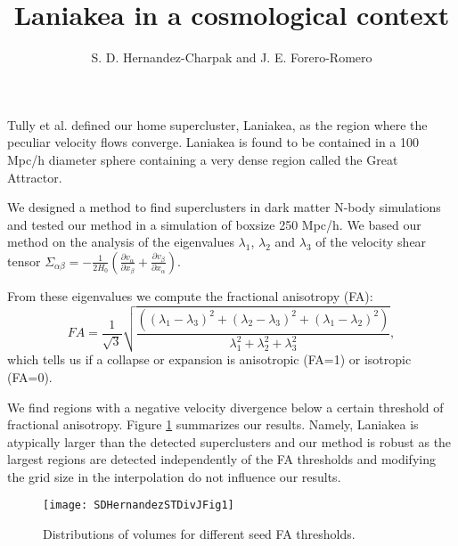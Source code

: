 \documentclass[preprint,proceedings]{rmaa}
\title{Laniakea in a cosmological context}
\author{S. D. Hernandez-Charpak\altaffilmark{1} and
    J. E. Forero-Romero\altaffilmark{1}}
\begin{document}
\maketitle 



Tully et al. defined our home supercluster, Laniakea, as the region where the peculiar
velocity flows converge. Laniakea is found to be contained in a 100 Mpc/h diameter
sphere containing a very dense region called the Great Attractor.

We designed a method to find superclusters in dark matter N-body simulations and tested
our method in a simulation of boxsize 250 Mpc/h. We based our method on the analysis of
the eigenvalues $\lambda_1$, $\lambda_2$ and
 $\lambda_3$ of the velocity shear tensor $\Sigma _{\alpha\beta} = -\frac{1}{2 H_0} \left( \frac{\partial v_{\alpha}}{\partial
  x_{\beta}} + \frac{\partial v_{\beta}}{\partial x_{\alpha}}
\right)$.

From these eigenvalues we compute the fractional anisotropy
(FA):
\begin{equation}
  \label{eq:njump}
   FA = \frac{1}{\sqrt{3}} \sqrt{\frac{( \left( \lambda_1 - \lambda_3 \right)^2 +
   \left( \lambda_2 - \lambda_3 \right)^2 + \left( \lambda_1 - \lambda_2 \right)^2 
   )}{\lambda^{2}_1 + \lambda^{2}_2 + \lambda^{2}_3}},
\end{equation}
which tells us if a collapse or expansion is anisotropic (FA=1) or
isotropic (FA=0).

We find regions with a negative velocity divergence below a
certain threshold of fractional anisotropy.
Figure
\ref{fig:simple} summarizes our results. Namely, Laniakea is atypically larger than the detected
superclusters and our method is robust as the largest regions are detected independently of the
FA thresholds and modifying the grid size in the interpolation do not influence our
results.
\begin{figure}[!t]
  \texttt{[image: SDHernandezSTDivJFig1]}
  \caption{Distributions of volumes for different seed FA thresholds.
}
  \label{fig:simple}
\end{figure}
\end{document}
